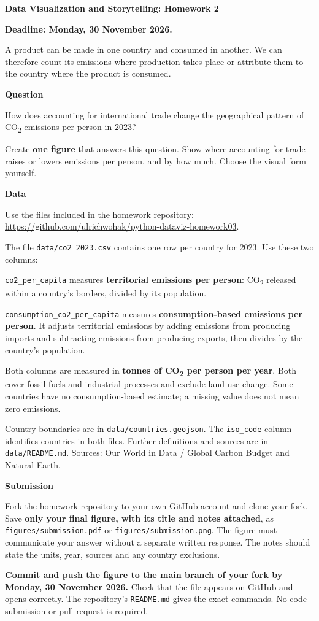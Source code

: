 \documentclass[11pt,a4paper]{article}
\begin{document}
\textbf{Data Visualization and Storytelling: Homework 2}

\textbf{Deadline: Monday, 30 November 2026.}

A product can be made in one country and consumed in another. We can
therefore count its emissions where production takes place or attribute
them to the country where the product is consumed.

\textbf{Question}

How does accounting for international trade change the geographical pattern
of CO\textsubscript{2} emissions per person in 2023?

Create \textbf{one figure} that answers this question. Show where accounting
for trade raises or lowers emissions per person, and by how much.
Choose the visual form yourself.

\textbf{Data}

Use the files included in the homework repository:\newline
\url{https://github.com/ulrichwohak/python-dataviz-homework03}.

The file \texttt{data/co2\_2023.csv} contains one row per country for 2023.
Use these two columns:

\texttt{co2\_per\_capita} measures \textbf{territorial emissions per person}:
CO\textsubscript{2} released within a country's borders, divided by its population.

\texttt{consumption\_co2\_per\_capita} measures
\textbf{consumption-based emissions per person}. It adjusts territorial
emissions by adding emissions from producing imports and subtracting emissions
from producing exports, then divides by the country's population.

Both columns are measured in \textbf{tonnes of CO\textsubscript{2} per person
per year}. Both cover fossil fuels and industrial processes and exclude
land-use change. Some countries have no consumption-based estimate;
a missing value does not mean zero emissions.

Country boundaries are in \texttt{data/countries.geojson}.
The \texttt{iso\_code} column identifies countries in both files.
Further definitions and sources are in \texttt{data/README.md}.
Sources: \href{https://github.com/owid/co2-data}{Our World in Data / Global Carbon Budget}
and \href{https://www.naturalearthdata.com/}{Natural Earth}.

\textbf{Submission}

Fork the homework repository to your own GitHub account and clone your fork.
Save \textbf{only your final figure, with its title and notes attached}, as
\texttt{figures/submission.pdf} or \texttt{figures/submission.png}.
The figure must communicate your answer without a separate written response.
The notes should state the units, year, sources and any country exclusions.

\textbf{Commit and push the figure to the main branch of your fork by
Monday, 30 November 2026.} Check that the file appears on GitHub and opens
correctly. The repository's \texttt{README.md} gives the exact commands.
No code submission or pull request is required.
\end{document}
